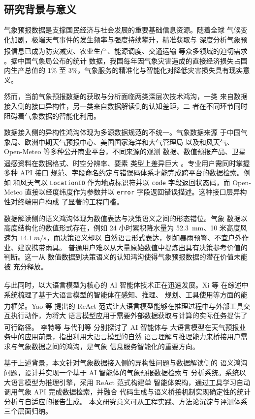 \documentclass[a4paper]{article}
\theoremstyle{definition}
\theoremstyle{plain}
\theoremstyle{remark}
\let\oldcite\cite
\renewcommand{\cite}[1]{\textsuperscript{\oldcite{#1}}}
\begin{document}
\subsection{研究背景与意义}
\label{sec:background}

气象预报数据是支撑国民经济与社会发展的重要基础信息资源。随着全球
气候变化加剧，极端天气事件的发生频率与强度持续攀升，精准获取与
深度分析气象预报信息已成为防灾减灾、农业生产、能源调度、交通运输
等众多领域的迫切需求 \cite{ref2, ref5}。据中国气象局公布的统计
数据，我国每年因气象灾害造成的直接经济损失占国内生产总值的 1\%
至 3\%，气象服务的精准化与智能化对降低灾害损失具有现实意义。

然而，当前气象预报数据的获取与分析面临两类深层次技术鸿沟，一类
来自数据接入侧的接口异构性，另一类来自数据解读侧的认知差距，二
者在不同环节同时阻碍着气象数据的智能化利用。

数据接入侧的异构性鸿沟体现为多源数据规范的不统一。气象数据来源
于中国气象局、欧洲中期天气预报中心、美国国家海洋和大气管理局
以及和风天气、Open-Meteo 等多种公开商业平台，不同来源的观测
数据、数值预报产品、卫星遥感资料在数据格式、时空分辨率、要素
类型上差异巨大 \cite{ref25}。专业用户需同时掌握多种 API 接口
规范、字段命名约定与错误码体系才能完成跨平台的数据检索。例如
和风天气以 \texttt{LocationID} 作为地点标识符并以 \texttt{code}
字段返回状态码，而 Open-Meteo 直接以经度纬度作为参数并以
\texttt{error} 字段返回错误描述。这种接口层异构性对终端用户构成
了显著的工程门槛。

数据解读侧的语义鸿沟体现为数值表达与决策语义之间的形态错位。气象
数据以高度结构化的数值形式存在，例如 24 小时累积降水量为
\SI{52.3}{mm}、10 米高度风速为 $\SI{14.1}{m/s}$，而决策语义却以
自然语言形式表达，例如暴雨预警、不宜户外作业、建议携带雨具。
普通用户难以从大量原始数值中提炼出具有决策参考价值的判断。这一从
数值数据到决策语义的认知鸿沟使得气象预报数据的潜在价值未能被
充分释放。

与此同时，以大语言模型为核心的 AI 智能体技术正在迅速发展。Xi 等
\cite{ref10} 在综述中系统梳理了基于大语言模型的智能体在感知、推理、
规划、工具使用等方面的能力框架。Yao 等 \cite{ref18} 提出的 ReAct
范式让大语言模型能够在推理过程中与外部工具交互执行动作，为将大
语言模型应用于需要外部数据获取与计算的实际任务提供了可行路径。
李特等 \cite{ref2} 与代刊等 \cite{ref5} 分别探讨了 AI 智能体与
大语言模型在天气预报业务中的应用前景，指出利用大语言模型的自然
语言理解与推理能力来桥接用户需求与气象数据之间的鸿沟，是气象
信息服务智能化的重要方向。

基于上述背景，本文针对气象数据接入侧的异构性问题与数据解读侧的
语义鸿沟问题，设计并实现一个基于 AI 智能体的气象预报数据检索与
分析系统。系统以大语言模型为推理引擎，采用 ReAct 范式构建单
智能体架构，通过工具学习自动调用气象 API 完成数据检索，并融合
代码生成与语义桥接机制实现确定性的统计分析与自适应的报告生成。
本文研究意义可从工程实践、方法论沉淀与评测体系三个层面归纳。
\end{document}
